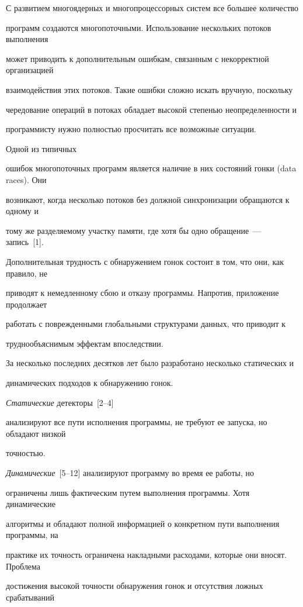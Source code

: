   С развитием многоядерных и многопроцессорных систем все большее количество

программ создаются многопоточными. Использование нескольких потоков выполнения

может приводить к дополнительным ошибкам, связанным с некорректной организацией

взаимодействия этих потоков. Такие ошибки сложно искать вручную, поскольку

чередование операций в потоках обладает высокой степенью неопределенности и

программисту нужно полностью просчитать все возможные ситуации.

Одной из типичных

ошибок многопоточных программ является наличие в них состояний гонки (data races). Они

возникают, когда несколько потоков без должной синхронизации обращаются к одному и

тому же разделяемому участку памяти, где хотя бы одно обращение~--- запись~[1].

Дополнительная трудность с обнаружением гонок состоит в том, что они, как правило, не

приводят к немедленному сбою и отказу программы. Напротив, приложение продолжает

работать с поврежденными глобальными структурами данных, что приводит к

труднообъяснимым эффектам впоследствии.



  За несколько последних десятков лет было разработано несколько статических и

динамических подходов к обнаружению гонок.

\textit{Статические} детекторы~[2--4]

анализируют все пути исполнения программы, не требуют ее запуска, но обладают низкой

точностью.

\textit{Динамические}~[5--12] анализируют программу во время ее работы, но

ограничены лишь фактическим путем выполнения программы. Хотя динамические

алгоритмы и обладают полной информацией о конкретном пути выполнения программы, на

практике их точность ограничена накладными расходами, которые они вносят. Проблема

достижения высокой точности обнаружения гонок и отсутствия ложных срабатываний

